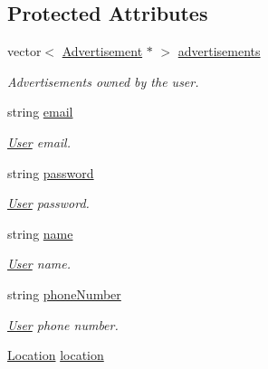 \subsection*{Protected Attributes}
\begin{DoxyCompactItemize}
\item 
\hypertarget{class_user_a9a78e0f9ab50c5d9d3041d1d90acd4d8}{}vector$<$ \hyperlink{class_advertisement}{Advertisement} $\ast$ $>$ \hyperlink{class_user_a9a78e0f9ab50c5d9d3041d1d90acd4d8}{advertisements}\label{class_user_a9a78e0f9ab50c5d9d3041d1d90acd4d8}

\begin{DoxyCompactList}\small\item\em Advertisements owned by the user. \end{DoxyCompactList}\item 
\hypertarget{class_user_a2d678acd22b533660b4b7d8404961f14}{}string \hyperlink{class_user_a2d678acd22b533660b4b7d8404961f14}{email}\label{class_user_a2d678acd22b533660b4b7d8404961f14}

\begin{DoxyCompactList}\small\item\em \hyperlink{class_user}{User} email. \end{DoxyCompactList}\item 
\hypertarget{class_user_ab537b9a55bc7d7fcafcdf8e53d085e67}{}string \hyperlink{class_user_ab537b9a55bc7d7fcafcdf8e53d085e67}{password}\label{class_user_ab537b9a55bc7d7fcafcdf8e53d085e67}

\begin{DoxyCompactList}\small\item\em \hyperlink{class_user}{User} password. \end{DoxyCompactList}\item 
\hypertarget{class_user_a643f85779a4693855c171c396f49e515}{}string \hyperlink{class_user_a643f85779a4693855c171c396f49e515}{name}\label{class_user_a643f85779a4693855c171c396f49e515}

\begin{DoxyCompactList}\small\item\em \hyperlink{class_user}{User} name. \end{DoxyCompactList}\item 
\hypertarget{class_user_a727ba647fe019be6fa9c03308d60da9e}{}string \hyperlink{class_user_a727ba647fe019be6fa9c03308d60da9e}{phone\+Number}\label{class_user_a727ba647fe019be6fa9c03308d60da9e}

\begin{DoxyCompactList}\small\item\em \hyperlink{class_user}{User} phone number. \end{DoxyCompactList}\item 
\hypertarget{class_user_a1c8e68a346c8a47d8cf0e75356c66562}{}\hyperlink{class_location}{Location} \hyperlink{class_user_a1c8e68a346c8a47d8cf0e75356c66562}{location}\label{class_user_a1c8e68a346c8a47d8cf0e75356c66562}


\end{DoxyCompactItemize}
